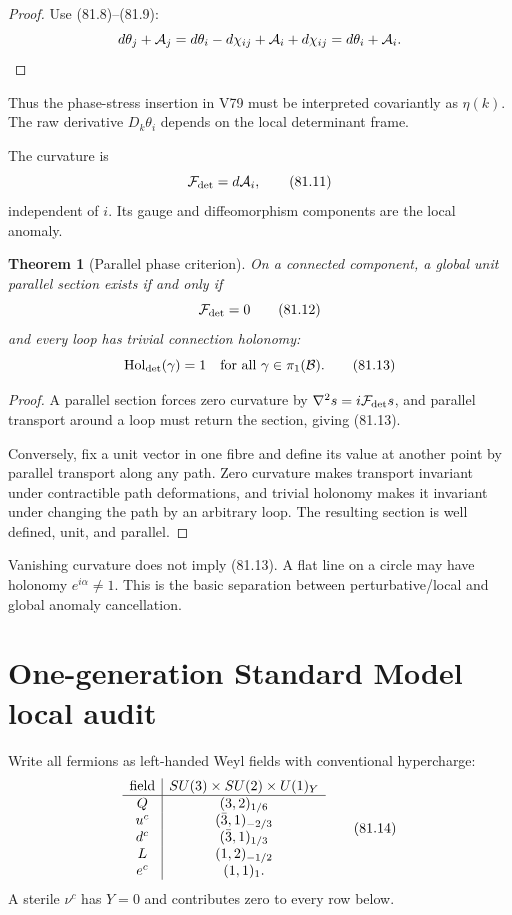 \documentclass[11pt]{article}
\newtheorem{theorem}{Theorem}[section]
\theoremstyle{remark}
\begin{document}
\begin{proof}
Use (81.8)--(81.9):
\[
 d\theta_j+{\cal A}_j
 =
 d\theta_i-d\chi_{ij}+{\cal A}_i+d\chi_{ij}
 =
 d\theta_i+{\cal A}_i.
\]
\end{proof}

Thus the phase-stress insertion in V79 must be interpreted
covariantly as \(\eta(k)\).  The raw derivative \(D_k\theta_i\)
depends on the local determinant frame.

The curvature is
\[
 {\cal F}_{\rm det}=d{\cal A}_i,                      \tag{81.11}
\]
independent of \(i\).  Its gauge and diffeomorphism components are
the local anomaly.

\begin{theorem}[Parallel phase criterion]
\label{thm:v15v81-parallel}
On a connected component, a global unit parallel section exists if
and only if
\[
 {\cal F}_{\rm det}=0                                 \tag{81.12}
\]
and every loop has trivial connection holonomy:
\[
 {\rm Hol}_{\rm det}(\gamma)=1
 \quad\hbox{for all }\gamma\in\pi_1({\cal B}).         \tag{81.13}
\]
\end{theorem}

\begin{proof}
A parallel section forces zero curvature by
\(\nabla^2s=i{\cal F}_{\rm det}s\), and parallel transport around a
loop must return the section, giving (81.13).

Conversely, fix a unit vector in one fibre and define its value at
another point by parallel transport along any path.  Zero curvature
makes transport invariant under contractible path deformations,
and trivial holonomy makes it invariant under changing the path by
an arbitrary loop.  The resulting section is well defined, unit,
and parallel.
\end{proof}

Vanishing curvature does not imply (81.13).  A flat line on a
circle may have holonomy \(e^{i\alpha}\ne1\).  This is the basic
separation between perturbative/local and global anomaly
cancellation.

\section{One-generation Standard Model local audit}

Write all fermions as left-handed Weyl fields with conventional
hypercharge:
\[
\begin{array}{c|c}
\hbox{field}&SU(3)\times SU(2)\times U(1)_Y\\ \hline
Q&(3,2)_{1/6}\\
u^c&(\bar3,1)_{-2/3}\\
d^c&(\bar3,1)_{1/3}\\
L&(1,2)_{-1/2}\\
e^c&(1,1)_{1}.
\end{array}                                             \tag{81.14}
\]
A sterile \(\nu^c\) has \(Y=0\) and contributes zero to every row
below.
\end{document}
